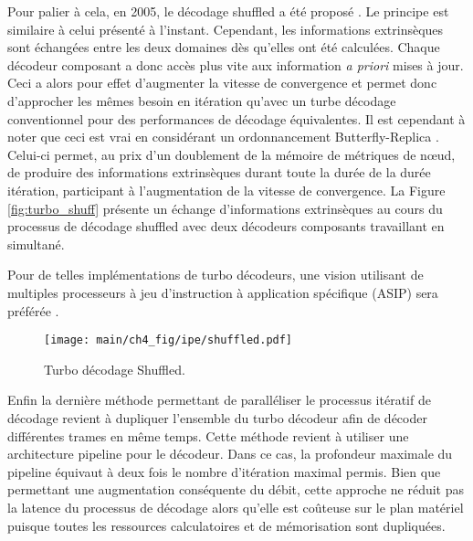 Pour palier à cela, en 2005, le décodage shuffled a été proposé \cite{turbo_shuff}. Le principe est similaire à celui 
présenté à l'instant. Cependant, les informations extrinsèques sont échangées entre les deux domaines dès qu'elles ont 
été calculées. Chaque décodeur composant a donc accès plus vite aux information \textit{a priori} mises à jour. Ceci a 
alors pour effet d'augmenter la vitesse de convergence et permet donc d'approcher les mêmes besoin en itération qu'avec
un turbe décodage conventionnel pour des performances de décodage équivalentes. Il est cependant à noter que ceci est 
vrai en considérant un ordonnancement Butterfly-Replica \cite{butt_replica}. Celui-ci permet, au prix d'un doublement de 
la mémoire de métriques de nœud, de produire des informations extrinsèques durant toute la durée de la durée itération, 
participant à l'augmentation de la vitesse de convergence.
La Figure \ref{fig:turbo_shuff} présente un échange d'informations extrinsèques au cours du processus de décodage shuffled avec deux décodeurs composants travaillant en simultané.

Pour de telles implémentations de turbo décodeurs, une vision utilisant de multiples processeurs à jeu d’instruction à application spécifique (ASIP) sera préférée \cite{asip}.

\begin{figure}[!h]
	\centering
	\texttt{[image: main/ch4\_fig/ipe/shuffled.pdf]}
	\caption{Turbo décodage Shuffled. \label{fig:turbo_suff}}
\end{figure}

Enfin la dernière méthode permettant de paralléliser le processus itératif de décodage revient à dupliquer l'ensemble 
du turbo décodeur afin de décoder différentes trames en même temps. Cette méthode revient à utiliser une architecture 
pipeline pour le décodeur. Dans ce cas, la profondeur maximale du pipeline équivaut à deux fois le nombre d'itération 
maximal permis. Bien que permettant une augmentation 
conséquente du débit, cette approche ne réduit pas la latence du processus de décodage alors qu'elle est coûteuse sur 
le plan matériel puisque toutes les ressources calculatoires et de mémorisation sont dupliquées.

